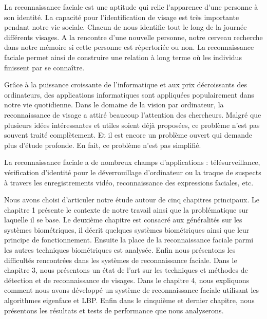 \hspace*{10pt}La reconnaissance faciale est une aptitude qui relie l'apparence d'une personne à son identité. La capacité pour l'identification de visage est très importante pendant notre vie sociale. Chacun de nous identifie tout le long de la journée différents visages. A la rencontre d'une nouvelle personne, notre cerveau recherche dans notre mémoire si cette personne est répertoriée ou non. La reconnaissance faciale permet ainsi de construire une relation à long terme où les individus finissent par se connaître. \\

\thispagestyle{empty}

\hspace*{10pt}Grâce à la puissance croissante de l'informatique et aux prix décroissants des ordinateurs, des applications informatiques sont appliquées populairement dans notre vie quotidienne. Dans le domaine de la vision par ordinateur, la reconnaissance de visage a attiré beaucoup l'attention des chercheurs. Malgré que plusieurs idées intéressantes et utiles soient déjà proposées, ce problème n'est pas souvent traité complètement. Et il est encore un problème ouvert qui demande plus d'étude profonde. En fait, ce problème n'est pas simplifié.

La reconnaissance faciale a de nombreux champs d'applications : télésurveillance, vérification d'identité pour le déverrouillage d'ordinateur ou la traque de suspects à travers les enregistrements vidéo, reconnaissance des expressions faciales, etc. 

Nous avons choisi d'articuler notre étude autour de cinq chapitres principaux. Le chapitre 1 présente le contexte de notre travail ainsi que la problématique sur laquelle il se base. Le deuxième chapitre est consacré aux généralités sur les systèmes biométriques, il décrit quelques systèmes biométriques ainsi que leur principe de fonctionnement. Ensuite la place de la reconnaissance faciale parmi les autres techniques biométriques est analysée. Enfin nous présentons les difficultés rencontrées dans les systèmes de reconnaissance faciale. Dans le chapitre 3, nous présentons un état de l'art sur les techniques et méthodes de détection et de reconnaissance de visages. Dans le chapitre 4, nous expliquons comment nous avons développé un système de reconnaissance faciale utilisant les algorithmes eigenface et LBP. Enfin dans le cinquième et dernier chapitre, nous présentons les résultats et tests de performance que nous analyserons.





\nocite{MAL}


